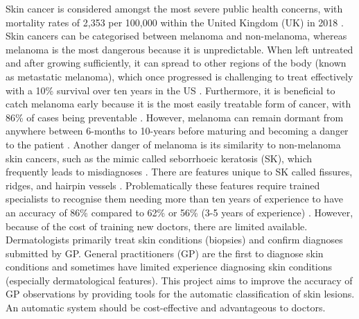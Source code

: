 \documentclass[10.5pt]{report}
\begin{document}
Skin cancer is considered amongst the most severe public health concerns, with mortality rates of 2,353 per 100,000 within the United Kingdom (UK) in 2018 \cite{UK2019}. Skin cancers can be categorised between melanoma and non-melanoma, whereas melanoma is the most dangerous because it is unpredictable. When left untreated and after growing sufficiently, it can spread to other regions of the body (known as metastatic melanoma), which once progressed is challenging to treat effectively with a 10\% survival over ten years in the US \cite{bhatia2009}. Furthermore, it is beneficial to catch melanoma early because it is the most easily treatable form of cancer, with 86\% of cases being preventable \cite{UK2019}. However, melanoma can remain dormant from anywhere between 6-months to 10-years before maturing and becoming a danger to the patient \cite{UK2019}. Another danger of melanoma is its similarity to non-melanoma skin cancers, such as the mimic called seborrhoeic keratosis (SK), which frequently leads to misdiagnoses \cite{Izikson2002}. There are features unique to SK called fissures, ridges, and hairpin vessels \cite{Minagawa2017}. Problematically these features require trained specialists to recognise them needing more than ten years of experience to have an accuracy of 86\% compared to 62\% or 56\% (3-5 years of experience) \cite{Morton1998}. However, because of the cost of training new doctors, there are limited available. Dermatologists primarily treat skin conditions (biopsies) and confirm diagnoses submitted by GP. General practitioners (GP) are the first to diagnose skin conditions and sometimes have limited experience diagnosing skin conditions (especially dermatological features). This project aims to improve the accuracy of GP observations by providing tools for the automatic classification of skin lesions. An automatic system should be cost-effective and advantageous to doctors.
\end{document}

